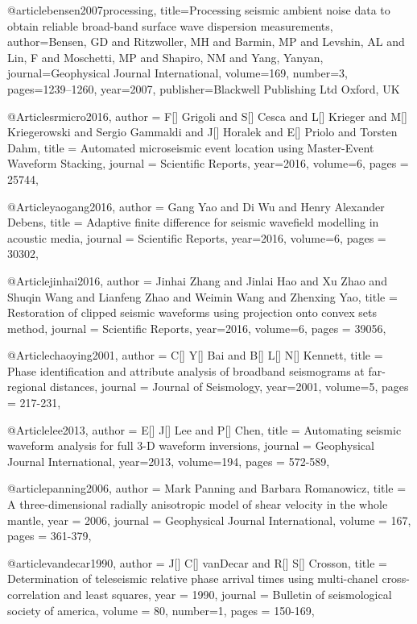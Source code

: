 @article{bensen2007processing,
  title={Processing seismic ambient noise data to obtain reliable broad-band surface wave dispersion measurements},
  author={Bensen, GD and Ritzwoller, MH and Barmin, MP and Levshin, AL and Lin, F and Moschetti, MP and Shapiro, NM and Yang, Yanyan},
  journal={Geophysical Journal International},
  volume={169},
  number={3},
  pages={1239--1260},
  year={2007},
  publisher={Blackwell Publishing Ltd Oxford, UK}
}

@Article{srmicro2016,
  author =	 {F[] Grigoli and S[] Cesca and L[] Krieger and M[] Kriegerowski and Sergio Gammaldi and J[] Horalek and E[] Priolo and Torsten Dahm},
  title =	 {Automated microseismic event location using Master-Event Waveform Stacking},
  journal =	 {Scientific Reports},
  year=2016,
  volume=6,
  pages =	 {25744},
}

@Article{yaogang2016,
  author =	 {Gang Yao and Di Wu and Henry Alexander Debens},
  title =	 {Adaptive finite difference for seismic wavefield modelling in acoustic media},
  journal =	 {Scientific Reports},
  year=2016,
  volume=6,
  pages =	 {30302},
}

@Article{jinhai2016,
  author =	 {Jinhai Zhang and Jinlai Hao and Xu Zhao and Shuqin Wang and Lianfeng Zhao and Weimin Wang and Zhenxing Yao},
  title =	 {Restoration of clipped seismic waveforms using projection onto convex sets method},
  journal =	 {Scientific Reports},
  year=2016,
  volume=6,
  pages =	 {39056},
}

@Article{chaoying2001,
  author =	 {C[] Y[] Bai and B[] L[] N[] Kennett},
  title =	 {Phase identification and attribute analysis of broadband seismograms at far-regional distances},
  journal =	 {Journal of Seismology},
  year=2001,
  volume=5,
  pages =	 {217-231},
}



@Article{lee2013,
  author =	 {E[] J[] Lee and P[] Chen},
  title =	 {Automating seismic waveform analysis for full 3-{D} waveform inversions},
  journal =	 {Geophysical Journal International},
  year=2013,
  volume=194,
  pages =	 {572-589},
}

@article{panning2006,
author = {Mark Panning and Barbara Romanowicz},
title = {A three-dimensional radially anisotropic model of shear velocity
in the whole mantle},
year = {2006},
journal = {Geophysical Journal International},
volume = {167},
pages = {361-379},
}

@article{vandecar1990,
author = {J[] C[] vanDecar and R[] S[] Crosson},
title = {Determination of teleseismic relative phase arrival times using multi-chanel cross-correlation and least squares},
year = {1990},
journal = {Bulletin of seismological society of america},
volume = {80},
number=1,
pages = {150-169},
}

